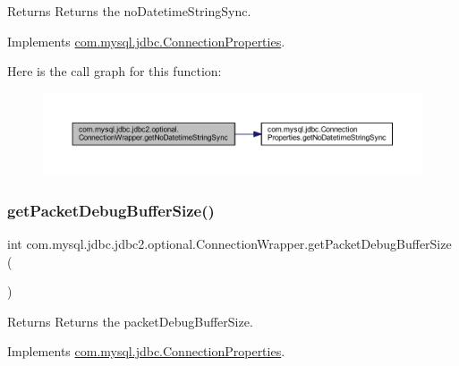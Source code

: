\begin{DoxyReturn}{Returns}
Returns the no\+Datetime\+String\+Sync. 
\end{DoxyReturn}


Implements \mbox{\hyperlink{interfacecom_1_1mysql_1_1jdbc_1_1_connection_properties_aa2bc32d658c0dbe027280d159da5dd49}{com.\+mysql.\+jdbc.\+Connection\+Properties}}.

Here is the call graph for this function\+:
\nopagebreak
\begin{figure}[H]
\begin{center}
\leavevmode
\includegraphics[width=350pt]{classcom_1_1mysql_1_1jdbc_1_1jdbc2_1_1optional_1_1_connection_wrapper_aa17bed727b36f4557e32e581a7abff7f_cgraph}
\end{center}
\end{figure}
\mbox{\label{classcom_1_1mysql_1_1jdbc_1_1jdbc2_1_1optional_1_1_connection_wrapper_ad3f5f474a7148a078c7cb5ff6b9b1a9d}} 
\subsubsection{\texorpdfstring{get\+Packet\+Debug\+Buffer\+Size()}{getPacketDebugBufferSize()}}
{\footnotesize\ttfamily int com.\+mysql.\+jdbc.\+jdbc2.\+optional.\+Connection\+Wrapper.\+get\+Packet\+Debug\+Buffer\+Size (\begin{DoxyParamCaption}{ }\end{DoxyParamCaption})}

\begin{DoxyReturn}{Returns}
Returns the packet\+Debug\+Buffer\+Size. 
\end{DoxyReturn}


Implements \mbox{\hyperlink{interfacecom_1_1mysql_1_1jdbc_1_1_connection_properties_ad21609c6c63ee0b69b4abdd5c4c7f39c}{com.\+mysql.\+jdbc.\+Connection\+Properties}}.

